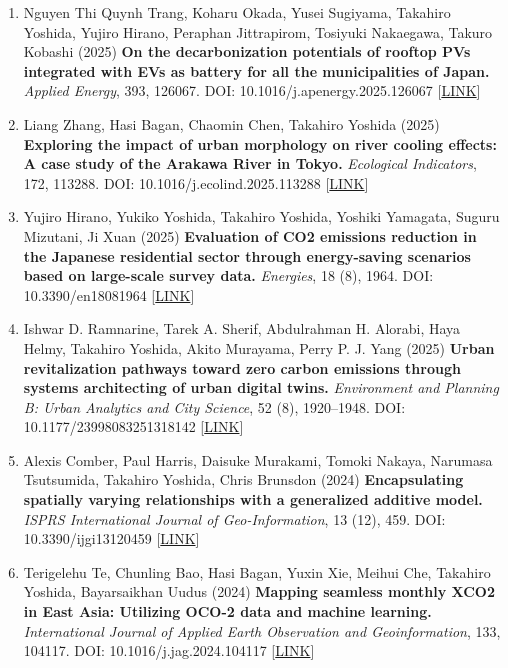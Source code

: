 \documentclass[
]{book}
\begin{document}
\begin{enumerate}
\item
  Nguyen Thi Quynh Trang, Koharu Okada, Yusei Sugiyama, Takahiro Yoshida, Yujiro Hirano, Peraphan Jittrapirom, Tosiyuki Nakaegawa, Takuro Kobashi (2025)
  \textbf{On the decarbonization potentials of rooftop PVs integrated with EVs as battery for all the municipalities of Japan.}
  \emph{Applied Energy}, 393, 126067.
  DOI: 10.1016/j.apenergy.2025.126067 {[}\href{https://www.sciencedirect.com/science/article/pii/S0306261925007974}{LINK}{]}
\item
  Liang Zhang, Hasi Bagan, Chaomin Chen, Takahiro Yoshida (2025)
  \textbf{Exploring the impact of urban morphology on river cooling effects: A case study of the Arakawa River in Tokyo.}
  \emph{Ecological Indicators}, 172, 113288.
  DOI: 10.1016/j.ecolind.2025.113288 {[}\href{https://doi.org/10.1016/j.ecolind.2025.113288}{LINK}{]}
\item
  Yujiro Hirano, Yukiko Yoshida, Takahiro Yoshida, Yoshiki Yamagata, Suguru Mizutani, Ji Xuan (2025)
  \textbf{Evaluation of CO2 emissions reduction in the Japanese residential sector through energy-saving scenarios based on large-scale survey data.}
  \emph{Energies}, 18 (8), 1964.
  DOI: 10.3390/en18081964 {[}\href{https://doi.org/10.3390/en18081964}{LINK}{]}
\item
  Ishwar D. Ramnarine, Tarek A. Sherif, Abdulrahman H. Alorabi, Haya Helmy, Takahiro Yoshida, Akito Murayama, Perry P. J. Yang (2025)
  \textbf{Urban revitalization pathways toward zero carbon emissions through systems architecting of urban digital twins.}
  \emph{Environment and Planning B: Urban Analytics and City Science}, 52 (8), 1920--1948.
  DOI: 10.1177/23998083251318142 {[}\href{https://doi.org/10.1177/23998083251318142}{LINK}{]}
\item
  Alexis Comber, Paul Harris, Daisuke Murakami, Tomoki Nakaya, Narumasa Tsutsumida, Takahiro Yoshida, Chris Brunsdon (2024)
  \textbf{Encapsulating spatially varying relationships with a generalized additive model.}
  \emph{ISPRS International Journal of Geo-Information}, 13 (12), 459.
  DOI: 10.3390/ijgi13120459 {[}\href{https://doi.org/10.3390/ijgi13120459}{LINK}{]}
\item
  Terigelehu Te, Chunling Bao, Hasi Bagan, Yuxin Xie, Meihui Che, Takahiro Yoshida, Bayarsaikhan Uudus (2024)
  \textbf{Mapping seamless monthly XCO2 in East Asia: Utilizing OCO-2 data and machine learning.}
  \emph{International Journal of Applied Earth Observation and Geoinformation}, 133, 104117.
  DOI: 10.1016/j.jag.2024.104117 {[}\href{https://www.sciencedirect.com/science/article/pii/S1569843224004710}{LINK}{]}

\end{enumerate}
\end{document}
